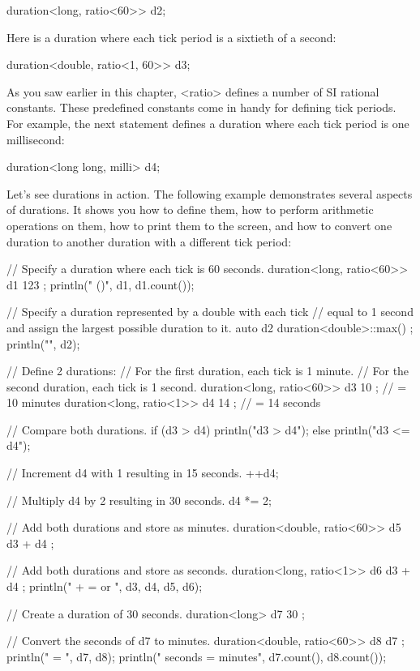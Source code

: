 \begin{cpp}
duration<long, ratio<60>> d2;
\end{cpp}

Here is a duration where each tick period is a sixtieth of a second:

\begin{cpp}
duration<double, ratio<1, 60>> d3;
\end{cpp}

As you saw earlier in this chapter, <ratio> defines a number of SI rational constants. These predefined constants come in handy for defining tick periods. For example, the next statement defines a duration where each tick period is one millisecond:

\begin{cpp}
duration<long long, milli> d4;
\end{cpp}


Let’s see durations in action. The following example demonstrates several aspects of durations. It shows you how to define them, how to perform arithmetic operations on them, how to print them to the screen, and how to convert one duration to another duration with a different tick period:

\begin{cpp}
// Specify a duration where each tick is 60 seconds.
duration<long, ratio<60>> d1 { 123 };
println("{} ({})", d1, d1.count());

// Specify a duration represented by a double with each tick
// equal to 1 second and assign the largest possible duration to it.
auto d2 { duration<double>::max() };
println("{}", d2);

// Define 2 durations:
// For the first duration, each tick is 1 minute.
// For the second duration, each tick is 1 second.
duration<long, ratio<60>> d3 { 10 }; // = 10 minutes
duration<long, ratio<1>> d4 { 14 }; // = 14 seconds

// Compare both durations.
if (d3 > d4) { println("d3 > d4"); }
else { println("d3 <= d4"); }

// Increment d4 with 1 resulting in 15 seconds.
++d4;

// Multiply d4 by 2 resulting in 30 seconds.
d4 *= 2;

// Add both durations and store as minutes.
duration<double, ratio<60>> d5 { d3 + d4 };

// Add both durations and store as seconds.
duration<long, ratio<1>> d6 { d3 + d4 };
println("{} + {} = {} or {}", d3, d4, d5, d6);

// Create a duration of 30 seconds.
duration<long> d7 { 30 };

// Convert the seconds of d7 to minutes.
duration<double, ratio<60>> d8 { d7 };
println("{} = {}", d7, d8);
println("{} seconds = {} minutes", d7.count(), d8.count());
\end{cpp}

